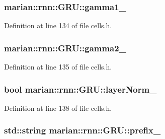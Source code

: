 \subsubsection[{\texorpdfstring{gamma1\+\_\+}{gamma1_}}]{ marian\+::rnn\+::\+G\+R\+U\+::gamma1\+\_\+\hspace{0.3cm}{\ttfamily [protected]}}\hypertarget{classmarian_1_1rnn_1_1GRU_a3902f55b7d37e9a57600508206ce95a3}{}\label{classmarian_1_1rnn_1_1GRU_a3902f55b7d37e9a57600508206ce95a3}


Definition at line 134 of file cells.\+h.

\subsubsection[{\texorpdfstring{gamma2\+\_\+}{gamma2_}}]{ marian\+::rnn\+::\+G\+R\+U\+::gamma2\+\_\+\hspace{0.3cm}{\ttfamily [protected]}}\hypertarget{classmarian_1_1rnn_1_1GRU_a24fd026dbc09e0367d4c05a6cae91a3e}{}\label{classmarian_1_1rnn_1_1GRU_a24fd026dbc09e0367d4c05a6cae91a3e}


Definition at line 135 of file cells.\+h.

\subsubsection[{\texorpdfstring{layer\+Norm\+\_\+}{layerNorm_}}]{\setlength{\rightskip}{0pt plus 5cm}bool marian\+::rnn\+::\+G\+R\+U\+::layer\+Norm\+\_\+\hspace{0.3cm}{\ttfamily [protected]}}\hypertarget{classmarian_1_1rnn_1_1GRU_af4559f4e35983ef5c4b228ca251f544c}{}\label{classmarian_1_1rnn_1_1GRU_af4559f4e35983ef5c4b228ca251f544c}


Definition at line 138 of file cells.\+h.

\subsubsection[{\texorpdfstring{prefix\+\_\+}{prefix_}}]{\setlength{\rightskip}{0pt plus 5cm}std\+::string marian\+::rnn\+::\+G\+R\+U\+::prefix\+\_\+\hspace{0.3cm}{\ttfamily [protected]}}\hypertarget{classmarian_1_1rnn_1_1GRU_a55a1c802bb9f2c757ba99c50390def07}{}\label{classmarian_1_1rnn_1_1GRU_a55a1c802bb9f2c757ba99c50390def07}


